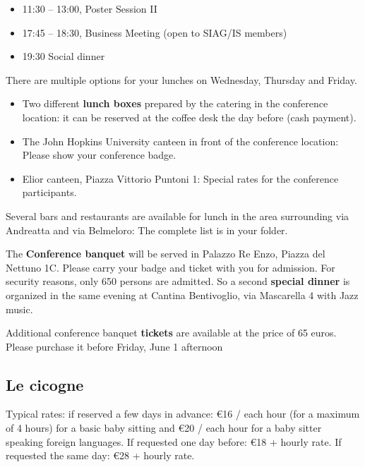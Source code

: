 \begin{itemize}
  \item[] 11:30 -- 13:00, Poster Session II
  \item[] 17:45 -- 18:30, Business Meeting (open to SIAG/IS members)
  \item[] 19:30 Social dinner
\end{itemize}


There are multiple options for your lunches on Wednesday, Thursday and Friday. 
\bigskip
\begin{itemize}
  \item Two different \textbf{lunch boxes} prepared by the catering in the conference location: it can be reserved at the coffee desk the day before (cash payment).
  \item The John Hopkins University canteen in front of the conference location: Please show your conference badge.
  \item Elior canteen, Piazza Vittorio Puntoni 1: Special rates for the conference participants.
\end{itemize}
\bigskip
Several bars and restaurants are available for lunch in the area surrounding via Andreatta and via Belmeloro: The complete list is in your folder.

The \textbf{Conference banquet} will be served in Palazzo Re Enzo, Piazza del Nettuno 1C. Please carry your badge and ticket with you for admission. For security
reasons, only 650 persons are admitted. So a second \textbf{special dinner} is organized in the same evening at Cantina Bentivoglio, via Mascarella 4 with 
Jazz music.

\bigskip 

\noindent Additional conference banquet \textbf{tickets} are available at the price of 65 euros. 
Please purchase it before Friday, June 1 afternoon

\subsection*{Le cicogne} 
Typical rates: if reserved a few days in advance: \euro 16 / each hour (for a maximum of 4 hours) for a basic baby sitting 
and \euro 20 / each hour for a baby sitter speaking foreign languages.
If requested one day before: \euro 18 + hourly rate.
If requested the same day: \euro 28 + hourly rate.

